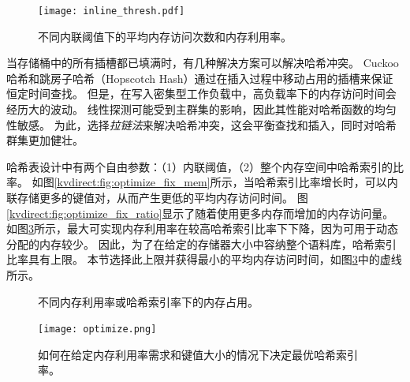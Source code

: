 \begin{figure}[htbp]
	\centering
	\texttt{[image: inline\_thresh.pdf]}
	\caption{不同内联阈值下的平均内存访问次数和内存利用率。}
	\label{kvdirect:fig:inline-offline}
\end{figure}


当存储桶中的所有插槽都已填满时，有几种解决方案可以解决哈希冲突。
Cuckoo哈希\cite {pagh2004cuckoo}和跳房子哈希（Hopscotch Hash）\cite {herlihy2008hopscotch}通过在插入过程中移动占用的插槽来保证恒定时间查找。
但是，在写入密集型工作负载中，高负载率下的内存访问时间会经历大的波动。
线性探测可能受到主群集的影响，因此其性能对哈希函数的均匀性敏感。
为此，选择\textit {拉链法}来解决哈希冲突，这会平衡查找和插入，同时对哈希群集更加健壮。


\label{kvdirect:sec:hashtable-eval}

哈希表设计中有两个自由参数：（1）内联阈值，（2）整个内存空间中哈希索引的比率。
如图\ref {kvdirect:fig:optimize_fix_mem}所示，当哈希索引比率增长时，可以内联存储更多的键值对，从而产生更低的平均内存访问时间。
图\ref {kvdirect:fig:optimize_fix_ratio}显示了随着使用更多内存而增加的内存访问量。
如图\ref {kvdirect:fig:hashline-ratio}所示，最大可实现内存利用率在较高哈希索引比率下下降，因为可用于动态分配的内存较少。
因此，为了在给定的存储器大小中容纳整个语料库，哈希索引比率具有上限。
本节选择此上限并获得最小的平均内存访问时间，如图\ref {kvdirect:fig:hashline-ratio}中的虚线所示。


\begin{figure}[htbp]
	\caption{不同内存利用率或哈希索引率下的内存占用。}
	\label{kvdirect:fig:memory-access-count}
\end{figure}

\begin{figure}[htbp]
	\centering
	\texttt{[image: optimize.png]}
	\caption{如何在给定内存利用率需求和键值大小的情况下决定最优哈希索引率。}
	\label{kvdirect:fig:hashline-ratio}
\end{figure}

